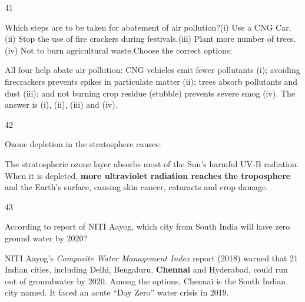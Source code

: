 \begin{question}{41}
{Which steps are to be taken for abatement of air pollution?\newline (i) Use a CNG Car.\newline (ii) Stop the use of fire crackers during festivals.\newline (iii) Plant more number of trees.\newline (iv) Not to burn agricultural waste.\newline Choose the correct options:\par}
\begin{explain}
All four help abate air pollution: CNG vehicles emit fewer pollutants (i); avoiding firecrackers prevents spikes in particulate matter (ii); trees absorb pollutants and dust (iii); and not burning crop residue (stubble) prevents severe smog (iv). The answer is (i), (ii), (iii) and (iv).
\end{explain}
\end{question}

\begin{question}{42}
{Ozone depletion in the stratosphere causes:\par}
\begin{explain}
The stratospheric ozone layer absorbs most of the Sun's harmful UV-B radiation. When it is depleted, \textbf{more ultraviolet radiation reaches the troposphere} and the Earth's surface, causing skin cancer, cataracts and crop damage.
\end{explain}
\end{question}

\begin{question}{43}
{According to report of NITI Aayog, which city from South India will have zero ground water by 2020?\par}
\begin{explain}
NITI Aayog's \emph{Composite Water Management Index} report (2018) warned that 21 Indian cities, including Delhi, Bengaluru, \textbf{Chennai} and Hyderabad, could run out of groundwater by 2020. Among the options, Chennai is the South Indian city named. It faced an acute ``Day Zero'' water crisis in 2019.
\end{explain}
\end{question}

